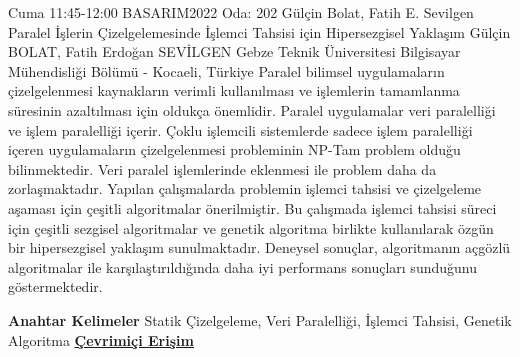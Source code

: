 
    \begin{abstract_basarim}
    {Cuma 11:45-12:00}
    {BASARIM2022}
    {Oda: 202}
    {Gülçin Bolat, Fatih E. Sevilgen}
    {Paralel İşlerin Çizelgelemesinde İşlemci Tahsisi için Hipersezgisel Yaklaşım}
    {%
    Gülçin BOLAT, Fatih Erdoğan SEVİLGEN}
    {%
    }
    {%
    Gebze Teknik Üniversitesi Bilgisayar Mühendisliği Bölümü - Kocaeli, Türkiye}
    Paralel bilimsel uygulamaların çizelgelenmesi kaynakların verimli kullanılması ve işlemlerin tamamlanma süresinin azaltılması için oldukça önemlidir. Paralel uygulamalar veri paralelliği ve işlem paralelliği içerir. Çoklu işlemcili sistemlerde sadece işlem paralelliği içeren uygulamaların çizelgelenmesi probleminin NP-Tam problem olduğu bilinmektedir. Veri paralel işlemlerinde eklenmesi ile problem daha da zorlaşmaktadır. Yapılan çalışmalarda problemin işlemci tahsisi ve çizelgeleme aşaması için çeşitli algoritmalar önerilmiştir. Bu çalışmada işlemci tahsisi süreci için çeşitli sezgisel algoritmalar ve genetik algoritma birlikte kullanılarak özgün bir hipersezgisel yaklaşım sunulmaktadır. Deneysel sonuçlar, algoritmanın açgözlü algoritmalar ile karşılaştırıldığında daha iyi performans sonuçları sunduğunu göstermektedir. 
    
            \textbf{Anahtar Kelimeler} \newline{}Statik Çizelgeleme, Veri Paralelliği, İşlemci Tahsisi, Genetik Algoritma
     \newline\newline\noindent \href{https://drive.google.com/file/d/1c0jtPiYMLjmZWjQ-hv_Q2JxYoaVz1Az0/view?usp=drivesdk}{\bfseries Çevrimiçi Erişim}
    \end{abstract_basarim}
    
